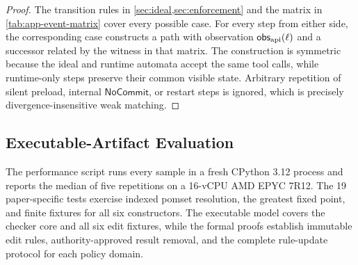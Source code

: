 \begin{proof}
The transition rules in \cref{sec:ideal,sec:enforcement} and the matrix in \cref{tab:app-event-matrix} cover every possible case.
For every step from either side, the corresponding case constructs a path with observation \(\mathsf{obs}_{\rm api}(\ell)\) and a successor related by the witness in that matrix.
The construction is symmetric because the ideal and runtime automata accept the same tool calls, while runtime-only steps preserve their common visible state.
Arbitrary repetition of silent preload, internal \(\mathsf{NoCommit}\), or restart steps is ignored, which is precisely divergence-insensitive weak matching.
\end{proof}

\subsection{Executable-Artifact Evaluation}
\label{app:artifact-bounds}

The performance script runs every sample in a fresh CPython 3.12 process and reports the median of five repetitions on a 16-vCPU AMD EPYC 7R12.
The 19 paper-specific tests exercise indexed pomset resolution, the greatest fixed point, and finite fixtures for all six constructors.
The executable model covers the checker core and all six edit fixtures, while the formal proofs establish immutable edit rules, authority-approved result removal, and the complete rule-update protocol for each policy domain.
